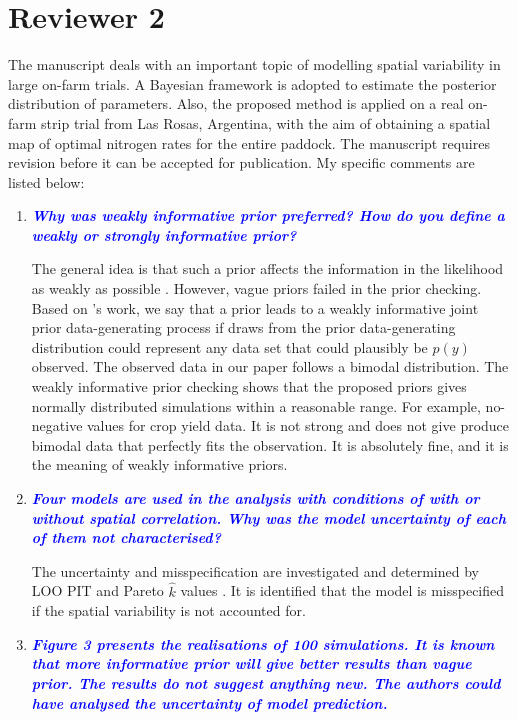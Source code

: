 \documentclass[a4paper]{article}   	%
\newcommand{\qtitle}[1]{\textit{\textbf{#1}}}
\begin{document}
\section*{Reviewer 2}

The manuscript deals with an important topic of modelling spatial variability in large on-farm trials. A Bayesian framework is adopted to estimate the posterior distribution of parameters. Also, the proposed method is applied on a real on-farm strip trial from Las Rosas, Argentina, with the aim of obtaining a spatial map of optimal nitrogen rates for the entire paddock. The manuscript requires revision before it can be accepted for publication. My specific comments are listed below:
\begin{enumerate}
    \item \qtitle{\textcolor{blue}{Why was weakly informative prior preferred? How do you define a weakly or strongly informative prior?}}
    
    The general idea is that such a prior affects the information in the likelihood as weakly as possible \parencite{Gelman2017Prior}. However, vague priors failed in the prior checking. Based on \textcite{Gabry2019Visualization}'s work, we say that a prior leads to a weakly informative joint prior data-generating process if draws from the prior data-generating distribution could represent any data set that could plausibly be $p(y)$ observed. The observed data in our paper follows a bimodal distribution. The weakly informative prior checking shows that the proposed priors gives normally distributed simulations within a reasonable range. For example, no-negative values for crop yield data. It is not strong and does not give produce bimodal data that perfectly fits the observation. It is absolutely fine, and it is the meaning of weakly informative priors. 
    
    \item \qtitle{\textcolor{blue}{Four models are used in the analysis with conditions of with or without spatial correlation. Why was the model uncertainty of each of them not characterised?}}
    
    The uncertainty and misspecification are investigated and determined by LOO PIT and Pareto $\hat{k}$ values \parencite{Gabry2019Visualization}. It is identified that the model is misspecified if the spatial variability is not accounted for. 

    \item \qtitle{\textcolor{blue}{Figure 3 presents the realisations of 100 simulations. It is known that more informative prior will give better results than vague prior. The results do not suggest anything new. The authors could have analysed the uncertainty of model prediction.}}
    

\end{enumerate}
\end{document}
